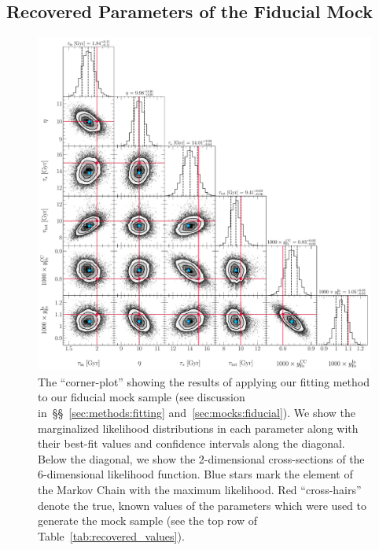 \documentclass[ms.tex]{subfiles}
\begin{document}
\subsection{Recovered Parameters of the Fiducial Mock}
\label{sec:mocks:fiducial_fit}

\begin{figure}
\centering
\includegraphics[scale = 0.45]{fiducial_76k8.pdf}
\caption{
The ``corner-plot'' showing the results of applying our fitting method to our
fiducial mock sample (see discussion in~\S\S~\ref{sec:methods:fitting}
and~\ref{sec:mocks:fiducial}).
We show the marginalized likelihood distributions in each parameter along with
their best-fit values and confidence intervals along the diagonal.
Below the diagonal, we show the 2-dimensional cross-sections of the
6-dimensional likelihood function.
Blue stars mark the element of the Markov Chain with the maximum likelihood.
Red ``cross-hairs'' denote the true, known values of the parameters which were
used to generate the mock sample (see the top row of
Table~\ref{tab:recovered_values}).
}
\label{fig:corner_fiducial}
\end{figure}
\end{document}
